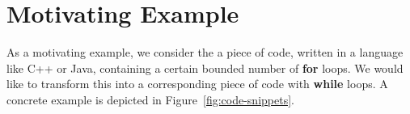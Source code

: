 
\section{Motivating Example}\label{sec:motivatingExample}

As a motivating example, we consider the a piece of code, written in a language like C++ or Java, containing a certain bounded number of \textbf{for} loops. We would like to transform this into a corresponding piece of code with \textbf{while} loops. A concrete example is depicted in Figure~\ref{fig:code-snippets}.
